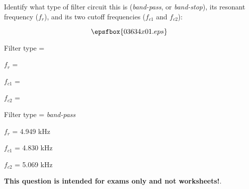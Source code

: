 

Identify what type of filter circuit this is ({\it band-pass}, or {\it band-stop}), its resonant frequency ($f_r$), and its two cutoff frequencies ($f_{c1}$ and $f_{c2}$):

$$\epsfbox{03634x01.eps}$$

Filter type =

\vskip 10pt

$f_r$ = 

\vskip 10pt

$f_{c1}$ =

\vskip 10pt

$f_{c2}$ = 







Filter type = {\it band-pass}

\vskip 10pt

$f_r$ = 4.949 kHz

\vskip 10pt

$f_{c1}$ = 4.830 kHz

\vskip 10pt

$f_{c2}$ = 5.069 kHz







{\bf This question is intended for exams only and not worksheets!}.



